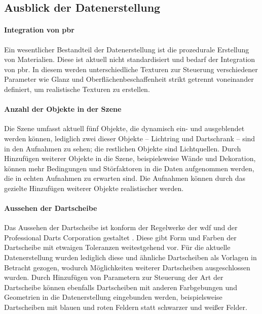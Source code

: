 
\subsection{Ausblick der Datenerstellung}
\label{sec:ausblick_data}

\paragraph{Integration von \ac{pbr}}

Ein wesentlicher Bestandteil der Datenerstellung ist die prozedurale Erstellung von Materialien. Diese ist aktuell nicht standardisiert und bedarf der Integration von \ac{pbr}. In diesem werden unterschiedliche Texturen zur Steuerung verschiedener Parameter wie Glanz und Oberflächenbeschaffenheit strikt getrennt voneinander definiert, um realistische Texturen zu erstellen.


\paragraph{Anzahl der Objekte in der Szene}

Die Szene umfasst aktuell fünf Objekte, die dynamisch ein- und ausgeblendet werden können, lediglich zwei dieser Objekte -- Lichtring und Dartschrank -- sind in den Aufnahmen zu sehen; die restlichen Objekte sind Lichtquellen. Durch Hinzufügen weiterer Objekte in die Szene, beispielsweise Wände und Dekoration, können mehr Bedingungen und Störfaktoren in die Daten aufgenommen werden, die in echten Aufnahmen zu erwarten sind. Die Aufnahmen können durch das gezielte Hinzufügen weiterer Objekte realistischer werden.


\paragraph{Aussehen der Dartscheibe}

Das Aussehen der Dartscheibe ist konform der Regelwerke der \ac{wdf} und der Professional Darts Corporation gestaltet \cite{wdf-rules,pdc_rules}. Diese gibt Form und Farben der Dartscheibe mit etwaigen Toleranzen weitestgehend vor. Für die aktuelle Datenerstellung wurden lediglich diese und ähnliche Dartscheiben als Vorlagen in Betracht gezogen, wodurch Möglichkeiten weiterer Dartscheiben ausgeschlossen wurden. Durch Hinzufügen von Parametern zur Steuerung der Art der Dartscheibe können ebenfalls Dartscheiben mit anderen Farbgebungen und Geometrien in die Datenerstellung eingebunden werden, beispielsweise Dartscheiben mit blauen und roten Feldern statt schwarzer und weißer Felder.

